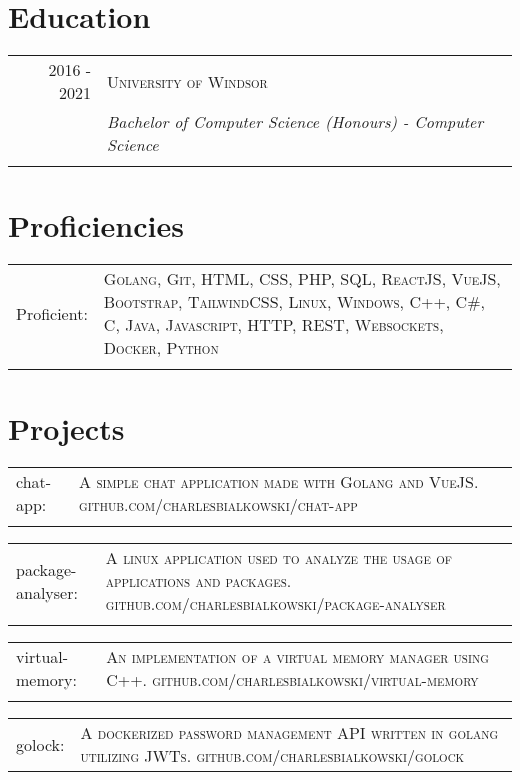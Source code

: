 \documentclass[a4paper,10pt]{article}
\begin{document}
\section{Education}

\begin{tabular}{r|p{11cm}}

	\textsc{2016 - 2021}&\textsc{University of Windsor} \\\textsc{}&\emph{Bachelor of Computer Science (Honours) - Computer Science}\\\multicolumn{2}{c}{}\\

\end{tabular}

\section{Proficiencies}

\begin{tabular}{p{2cm}p{11cm}}
	Proficient:& \textsc{Golang, Git, HTML, CSS, PHP, SQL, ReactJS, VueJS, Bootstrap, TailwindCSS, Linux, Windows, C++, C\#, C, Java, Javascript, HTTP, REST, Websockets, Docker, Python}\\\\	
\end{tabular}

\section{Projects}
\begin{tabular}{p{2cm}p{11cm}}
	chat-app:&\textsc{A simple chat application made with Golang and VueJS. github.com/charlesbialkowski/chat-app}\\\\
\end{tabular}

\begin{tabular} {p{2cm}p{11cm}}
	package-analyser:&\textsc{A linux application used to analyze the usage of applications and packages. github.com/charlesbialkowski/package-analyser} \\\\	
\end{tabular}

\begin{tabular}{p{2cm}p{11cm}}
	virtual-memory:&\textsc{An implementation of a virtual memory manager using C++. github.com/charlesbialkowski/virtual-memory} \\\\
\end{tabular}

\begin{tabular}{p{2cm}p{11cm}}
	golock:&\textsc{A dockerized password management API written in golang utilizing JWTs. github.com/charlesbialkowski/golock}
\end{tabular}
\end{document}
